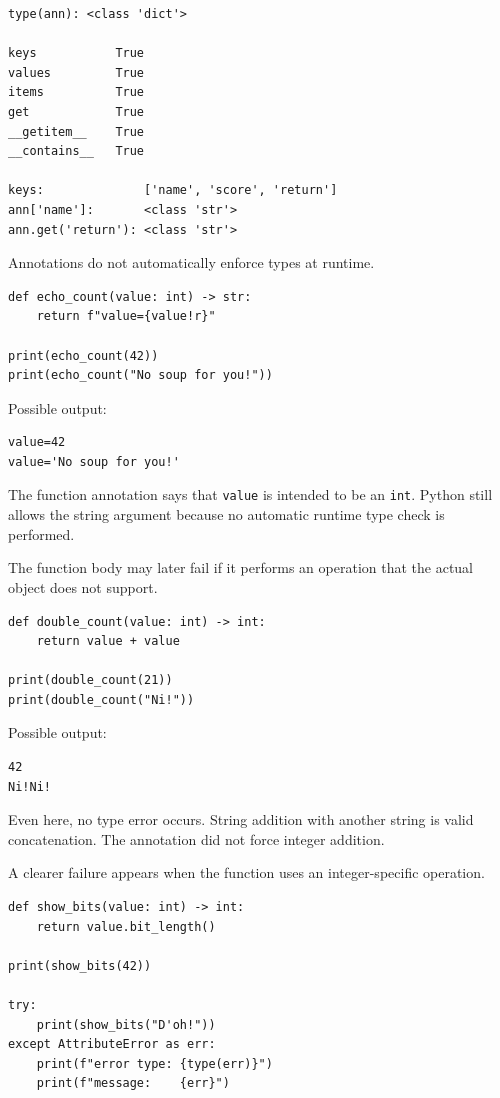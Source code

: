 \begin{verbatim}
type(ann): <class 'dict'>

keys           True
values         True
items          True
get            True
__getitem__    True
__contains__   True

keys:              ['name', 'score', 'return']
ann['name']:       <class 'str'>
ann.get('return'): <class 'str'>
\end{verbatim}

Annotations do not automatically enforce types at runtime.

\begin{verbatim}
def echo_count(value: int) -> str:
    return f"value={value!r}"

print(echo_count(42))
print(echo_count("No soup for you!"))
\end{verbatim}

Possible output:

\begin{verbatim}
value=42
value='No soup for you!'
\end{verbatim}

The function annotation says that \texttt{value} is intended to be an \texttt{int}. Python still allows the string argument because no automatic runtime type check is performed.

The function body may later fail if it performs an operation that the actual object does not support.

\begin{verbatim}
def double_count(value: int) -> int:
    return value + value

print(double_count(21))
print(double_count("Ni!"))
\end{verbatim}

Possible output:

\begin{verbatim}
42
Ni!Ni!
\end{verbatim}

Even here, no type error occurs. String addition with another string is valid concatenation. The annotation did not force integer addition.

A clearer failure appears when the function uses an integer-specific operation.

\begin{verbatim}
def show_bits(value: int) -> int:
    return value.bit_length()

print(show_bits(42))

try:
    print(show_bits("D'oh!"))
except AttributeError as err:
    print(f"error type: {type(err)}")
    print(f"message:    {err}")
\end{verbatim}

